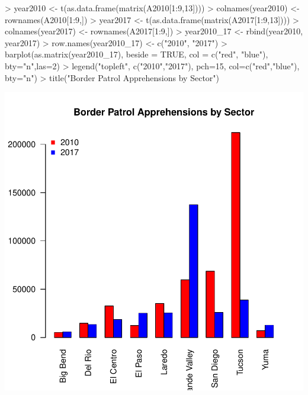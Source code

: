 \documentclass[letterpaper]{article}
\begin{document}
\begin{Schunk}
\begin{Sinput}
> year2010 <- t(as.data.frame(matrix(A2010[1:9,13])))
> colnames(year2010) <- rownames(A2010[1:9,])
> year2017 <- t(as.data.frame(matrix(A2017[1:9,13])))
> colnames(year2017) <- rownames(A2017[1:9,])
> year2010_17 <- rbind(year2010, year2017)
> row.names(year2010_17) <- c("2010", "2017")
> barplot(as.matrix(year2010_17), beside = TRUE, col = c("red", "blue"), bty="n",las=2)
> legend("topleft", c("2010","2017"), pch=15,  col=c("red","blue"),  bty="n")
> title("Border Patrol Apprehensions by Sector")
\end{Sinput}
\end{Schunk}
\includegraphics{Document-004}
    
\end{document}
